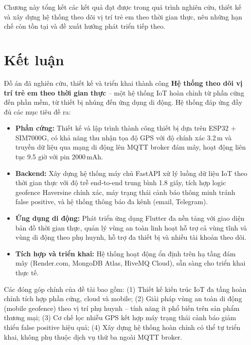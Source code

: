 \documentclass[../DoAn.tex]{subfiles}
\begin{document}
Chương này tổng kết các kết quả đạt được trong quá trình nghiên cứu, thiết kế và xây dựng hệ thống theo dõi vị trí trẻ em theo thời gian thực, nêu những hạn chế còn tồn tại và đề xuất hướng phát triển tiếp theo.

\section{Kết luận}

Đồ án đã nghiên cứu, thiết kế và triển khai thành công \textbf{Hệ thống theo dõi vị trí trẻ em theo thời gian thực} -- một hệ thống IoT hoàn chỉnh từ phần cứng đến phần mềm, từ thiết bị nhúng đến ứng dụng di động. Hệ thống đáp ứng đầy đủ các mục tiêu đề ra:

\begin{itemize}
  \item \textbf{Phần cứng:} Thiết kế và lập trình thành công thiết bị dựa trên ESP32 + SIM7000G, có khả năng thu nhận tọa độ GPS với độ chính xác 3.2\,m và truyền dữ liệu qua mạng di động lên MQTT broker đám mây, hoạt động liên tục 9.5 giờ với pin 2000\,mAh.

  \item \textbf{Backend:} Xây dựng hệ thống máy chủ FastAPI xử lý luồng dữ liệu IoT theo thời gian thực với độ trễ end-to-end trung bình 1.8 giây, tích hợp logic geofence Haversine chính xác, máy trạng thái cảnh báo thông minh tránh false positive, và hệ thống thông báo đa kênh (email, Telegram).

  \item \textbf{Ứng dụng di động:} Phát triển ứng dụng Flutter đa nền tảng với giao diện bản đồ thời gian thực, quản lý vùng an toàn linh hoạt hỗ trợ cả vùng tĩnh và vùng di động theo phụ huynh, hỗ trợ đa thiết bị và nhiều tài khoản theo dõi.

  \item \textbf{Tích hợp và triển khai:} Hệ thống hoạt động ổn định trên hạ tầng đám mây (Render.com, MongoDB Atlas, HiveMQ Cloud), sẵn sàng cho triển khai thực tế.
\end{itemize}

Các đóng góp chính của đề tài bao gồm: (1) Thiết kế kiến trúc IoT đa tầng hoàn chỉnh tích hợp phần cứng, cloud và mobile; (2) Giải pháp vùng an toàn di động (mobile geofence) theo vị trí phụ huynh -- tính năng ít phổ biến trên sản phẩm thương mại; (3) Cơ chế lọc nhiễu GPS kết hợp máy trạng thái cảnh báo giảm thiểu false positive hiệu quả; (4) Xây dựng hệ thống hoàn chỉnh có thể tự triển khai, không phụ thuộc dịch vụ thứ ba ngoài MQTT broker.
\end{document}

